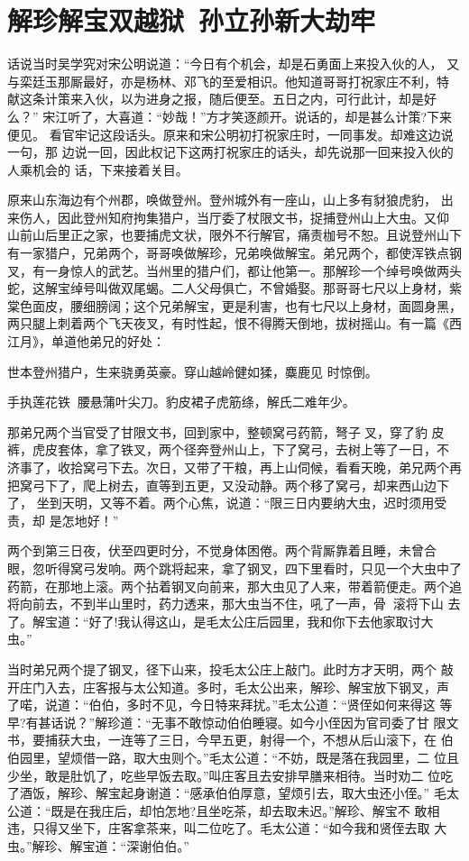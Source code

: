 \chapter{解珍解宝双越狱~孙立孙新大劫牢}

话说当时吴学究对宋公明说道：“今日有个机会，却是石勇面上来投入伙的人，
又与栾廷玉那厮最好，亦是杨林、邓飞的至爱相识。他知道哥哥打祝家庄不利，特
献这条计策来入伙，以为进身之报，随后便至。五日之内，可行此计，却是好么？”
宋江听了，大喜道：“妙哉！”方才笑逐颜开。说话的，却是甚么计策?下来便见。
看官牢记这段话头。原来和宋公明初打祝家庄时，一同事发。却难这边说一句，那
边说一回，因此权记下这两打祝家庄的话头，却先说那一回来投入伙的人乘机会的
话，下来接着关目。

原来山东海边有个州郡，唤做登州。登州城外有一座山，山上多有豺狼虎豹，
出来伤人，因此登州知府拘集猎户，当厅委了杖限文书，捉捕登州山上大虫。又仰
山前山后里正之家，也要捕虎文状，限外不行解官，痛责枷号不恕。且说登州山下
有一家猎户，兄弟两个，哥哥唤做解珍，兄弟唤做解宝。弟兄两个，都使浑铁点钢
叉，有一身惊人的武艺。当州里的猎户们，都让他第一。那解珍一个绰号唤做两头
蛇，这解宝绰号叫做双尾蝎。二人父母俱亡，不曾婚娶。那哥哥七尺以上身材，紫
棠色面皮，腰细膀阔；这个兄弟解宝，更是利害，也有七尺以上身材，面圆身黑，
两只腿上刺着两个飞天夜叉，有时性起，恨不得腾天倒地，拔树摇山。有一篇《西
江月》，单道他弟兄的好处：

世本登州猎户，生来骁勇英豪。穿山越岭健如猱，麋鹿见
时惊倒。

手执莲花铁，腰悬蒲叶尖刀。豹皮裙子虎筋绦，解氏二难年少。

那弟兄两个当官受了甘限文书，回到家中，整顿窝弓药箭，弩子叉，穿了豹
皮裤，虎皮套体，拿了铁叉，两个径奔登州山上，下了窝弓，去树上等了一日，不
济事了，收拾窝弓下去。次日，又带了干粮，再上山伺候，看看天晚，弟兄两个再
把窝弓下了，爬上树去，直等到五更，又没动静。两个移了窝弓，却来西山边下了，
坐到天明，又等不着。两个心焦，说道：“限三日内要纳大虫，迟时须用受责，却
是怎地好！”

两个到第三日夜，伏至四更时分，不觉身体困倦。两个背厮靠着且睡，未曾合
眼，忽听得窝弓发响。两个跳将起来，拿了钢叉，四下里看时，只见一个大虫中了
药箭，在那地上滚。两个拈着钢叉向前来，那大虫见了人来，带着箭便走。两个追
将向前去，不到半山里时，药力透来，那大虫当不住，吼了一声，骨滚将下山
去了。解宝道：“好了!我认得这山，是毛太公庄后园里，我和你下去他家取讨大
虫。”

当时弟兄两个提了钢叉，径下山来，投毛太公庄上敲门。此时方才天明，两个
敲开庄门入去，庄客报与太公知道。多时，毛太公出来，解珍、解宝放下钢叉，声
了喏，说道：“伯伯，多时不见，今日特来拜扰。”毛太公道：“贤侄如何来得这
等早?有甚话说？”解珍道：“无事不敢惊动伯伯睡寝。如今小侄因为官司委了甘
限文书，要捕获大虫，一连等了三日，今早五更，射得一个，不想从后山滚下，在
伯伯园里，望烦借一路，取大虫则个。”毛太公道：“不妨，既是落在我园里，二
位且少坐，敢是肚饥了，吃些早饭去取。”叫庄客且去安排早膳来相待。当时劝二
位吃了酒饭，解珍、解宝起身谢道：“感承伯伯厚意，望烦引去，取大虫还小侄。”
毛太公道：“既是在我庄后，却怕怎地?且坐吃茶，却去取未迟。”解珍、解宝不
敢相违，只得又坐下，庄客拿茶来，叫二位吃了。毛太公道：“如今我和贤侄去取
大虫。”解珍、解宝道：“深谢伯伯。”

